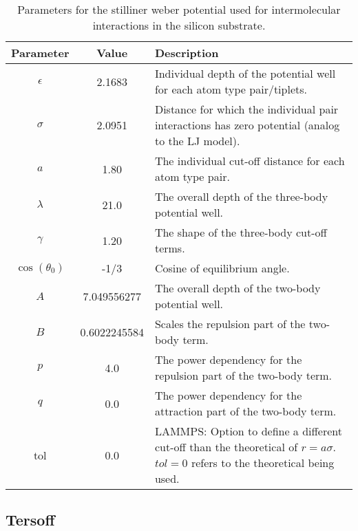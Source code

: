 \begin{table}[H]
  \begin{center}
  \caption{Parameters for the stilliner weber potential used for intermolecular interactions in the silicon substrate.}
  \label{tab:sw_param}
  \begin{tabular}{ | c | c | L{9cm} |} \hline
    Parameter & Value & Description \\ \hline 
    $\epsilon$ & 2.1683  & Individual depth of the potential well for each atom
    type pair/tiplets. \\ \hline
    $\sigma$ & 2.0951 & Distance for which the individual pair interactions has
    zero potential (analog to the LJ model). \\ \hline
    $a$ & 1.80 & The individual cut-off distance for each atom type pair. \\
    \hline
    $\lambda$ & 21.0 & The overall depth of the three-body potential well. \\
    \hline
    $\gamma$ & 1.20 & The shape of the three-body cut-off terms. \\ \hline
    $\cos{(\theta_0)}$ & -1/3 & Cosine of equilibrium angle. \\ \hline
    $A$ &  7.049556277 & The overall depth of the two-body potential well. \\
    \hline
    $B$ &  0.6022245584 & Scales the repulsion part of the two-body term. \\
    \hline
    $p$  & 4.0 & The power dependency for the repulsion part of the two-body
    term. \\ \hline
    $q$  & 0.0 & The power dependency for the attraction part of the two-body
    term. \\ \hline
    tol  & 0.0 & LAMMPS: Option to define a different cut-off than the
    theoretical of $r = a\sigma$. $tol = 0$ refers to the theoretical being
    used. \\ \hline
  \end{tabular}
  \end{center}
\end{table}



\subsection{Tersoff}


